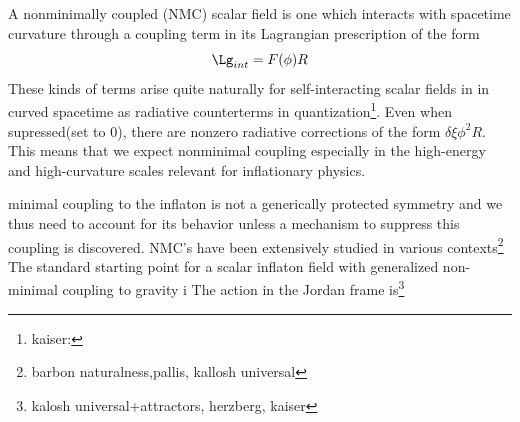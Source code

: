 A nonminimally coupled (NMC) scalar field is one which interacts with spacetime curvature through a coupling term in its Lagrangian prescription of the form
\[
\Lg_{int}=F(\phi)R
\]
These kinds of terms arise quite naturally for self-interacting scalar fields in in curved spacetime as radiative counterterms in quantization\footnote{kaiser:}. Even when supressed(set to 0), there are nonzero radiative corrections of the form $\delta \xi \phi^2 R$.  This means that we expect nonminimal coupling especially in the high-energy and high-curvature scales relevant for inflationary physics.

minimal coupling to the inflaton is not a generically protected symmetry and we thus need to account for its behavior unless a mechanism to suppress this coupling is discovered. NMC's have been extensively studied in various contexts\footnote{barbon naturalness,pallis, kallosh universal} The standard starting point for a scalar inflaton field with generalized non-minimal coupling to gravity  i The action in the Jordan frame is\footnote{kalosh universal+attractors, herzberg, kaiser}

